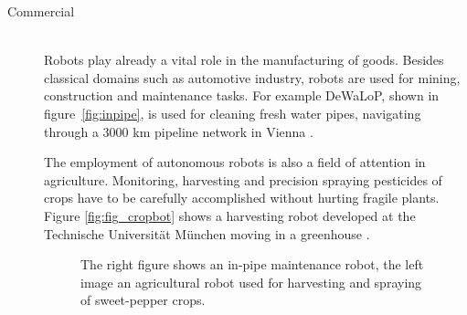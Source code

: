 \begin{description}
\item[Commercial]\hfill \\
Robots play already a vital role in the manufacturing of goods. Besides classical domains such as  automotive industry, robots are used for mining, construction and maintenance tasks. 
For example DeWaLoP, shown in figure~\ref{fig:inpipe}, is used for cleaning fresh water pipes, navigating through a 3000 km pipeline network in Vienna \cite{mateos2013inpipe}.   

The employment of autonomous robots is also a field of attention in agriculture. 
Monitoring, harvesting and precision spraying pesticides of crops have to be carefully accomplished without hurting fragile plants. 
Figure \ref{fig:fig_cropbot} shows a harvesting robot developed at the Technische Universit\"at M\"unchen moving in a greenhouse \cite{Schuetz2014}.

\begin{figure}[thpb]
	  \myfloatalign
      \footnotesize
      \centering
   \caption[Commercial robots]{The right figure shows an in-pipe maintenance robot, the left image an agricultural robot used for harvesting and spraying of sweet-pepper crops.}
   \label{fig:fig_commercial}
\end{figure}


\end{description}
